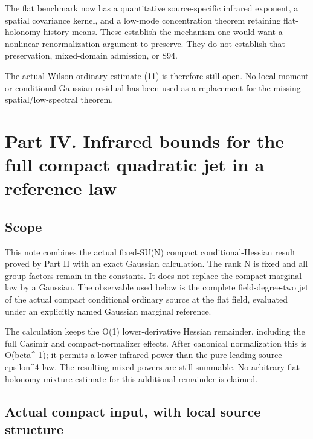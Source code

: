 \documentclass[
  11pt,
]{article}
\begin{document}
The flat benchmark now has a quantitative source-specific infrared
exponent, a spatial covariance kernel, and a low-mode concentration
theorem retaining flat-holonomy history means. These establish the
mechanism one would want a nonlinear renormalization argument to
preserve. They do not establish that preservation, mixed-domain
admission, or S94.

The actual Wilson ordinary estimate (11) is therefore still open. No
local moment or conditional Gaussian residual has been used as a
replacement for the missing spatial/low-spectral theorem.

\newpage

\hypertarget{part-iv.-infrared-bounds-for-the-full-compact-quadratic-jet-in-a-reference-law}{%
\section{Part IV. Infrared bounds for the full compact quadratic jet in
a reference
law}\label{part-iv.-infrared-bounds-for-the-full-compact-quadratic-jet-in-a-reference-law}}

\hypertarget{scope}{%
\subsection{Scope}\label{scope}}

This note combines the actual fixed-SU(N) compact conditional-Hessian
result proved by Part II with an exact Gaussian calculation. The rank N
is fixed and all group factors remain in the constants. It does not
replace the compact marginal law by a Gaussian. The observable used
below is the complete field-degree-two jet of the actual compact
conditional ordinary source at the flat field, evaluated under an
explicitly named Gaussian marginal reference.

The calculation keeps the O(1) lower-derivative Hessian remainder,
including the full Casimir and compact-normalizer effects. After
canonical normalization this is O(beta\^{}-1); it permits a lower
infrared power than the pure leading-source epsilon\^{}4 law. The
resulting mixed powers are still summable. No arbitrary flat-holonomy
mixture estimate for this additional remainder is claimed.

\hypertarget{actual-compact-input-with-local-source-structure}{%
\subsection{Actual compact input, with local source
structure}\label{actual-compact-input-with-local-source-structure}}
\end{document}
